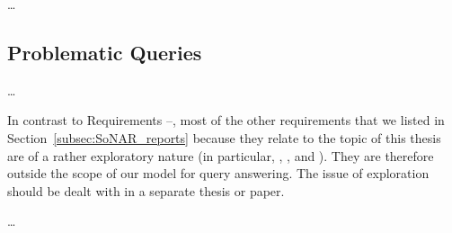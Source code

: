 \dots

\subsection{Problematic Queries}

\dots


In contrast to Requirements --,
most of the other requirements that 
we listed in Section~\ref{subsec:SoNAR_reports}
because they relate to the topic of this thesis
are of a rather exploratory nature
(in particular, , , and ).
They are therefore outside the scope of our model for query answering.
The issue of exploration should be dealt with in a separate
thesis or paper.



\dots


